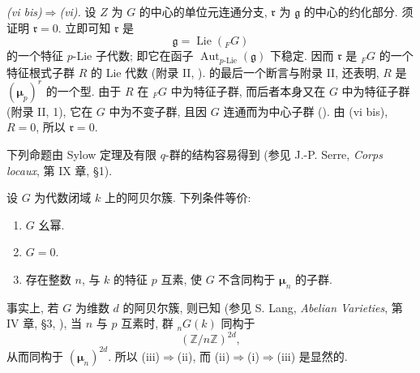 \medskip\noindent
\textit{(vi bis)\(\Rightarrow\)(vi).}\quad
设 \(Z\) 为 \(G\) 的中心的单位元连通分支,
\(\mathfrak r\) 为 \(\mathfrak g\) 的中心的约化部分.
须证明 \(\mathfrak r=0\). 立即可知 \(\mathfrak r\) 是
\[
  \mathfrak g=\operatorname{Lie}({}_{F}G)
\]
的一个特征 \(p\)-Lie 子代数; 即它在函子 \(\operatorname{Aut}_{p\text{-Lie}}(\mathfrak g)\)
下稳定. 因而 \(\mathfrak r\) 是 \({}_{F}G\) 的一个特征根式子群 \(R\) 的 Lie 代数
(附录 II, ).
 的最后一个断言与附录 II,
 还表明, \(R\) 是 \((\boldsymbol\mu_p)^r\) 的一个型.
由于 \(R\) 在 \({}_{F}G\) 中为特征子群, 而后者本身又在 \(G\) 中为特征子群
(附录 II, 1), 它在 \(G\) 中为不变子群,
且因 \(G\) 连通而为中心子群 ().
由 (vi bis), \(R=0\), 所以 \(\mathfrak r=0\).


下列命题由 Sylow 定理及有限 \(q\)-群的结构容易得到
(参见 J.-P. Serre, \emph{Corps locaux}, 第 IX 章, \S1).



设 \(G\) 为代数闭域 \(k\) 上的阿贝尔簇. 下列条件等价:
\begin{enumerate}
\item[(i)] 
\(G\) 幺幂.
\item[(ii)] 
\(G=0\).
\item[(iii)] 
存在整数 \(n\), 与 \(k\) 的特征 \(p\) 互素,
使 \(G\) 不含同构于 \(\boldsymbol\mu_n\) 的子群.
\end{enumerate}

事实上, 若 \(G\) 为维数 \(d\) 的阿贝尔簇, 则已知
(参见 S. Lang, \emph{Abelian Varieties}, 第 IV 章, \S3,
),
当 \(n\) 与 \(p\) 互素时, 群 \({}_nG(k)\) 同构于
\[
  (\mathbb Z/n\mathbb Z)^{2d},
\]
从而同构于 \((\boldsymbol\mu_n)^{2d}\).
所以 (iii)\(\Rightarrow\)(ii), 而 (ii)\(\Rightarrow\)(i)\(\Rightarrow\)(iii) 是显然的.


